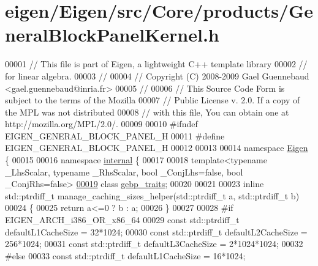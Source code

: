 \hypertarget{eigen_2_eigen_2src_2_core_2products_2_general_block_panel_kernel_8h_source}{}\section{eigen/\+Eigen/src/\+Core/products/\+General\+Block\+Panel\+Kernel.h}
\label{eigen_2_eigen_2src_2_core_2products_2_general_block_panel_kernel_8h_source}

\begin{DoxyCode}
00001 \textcolor{comment}{// This file is part of Eigen, a lightweight C++ template library}
00002 \textcolor{comment}{// for linear algebra.}
00003 \textcolor{comment}{//}
00004 \textcolor{comment}{// Copyright (C) 2008-2009 Gael Guennebaud <gael.guennebaud@inria.fr>}
00005 \textcolor{comment}{//}
00006 \textcolor{comment}{// This Source Code Form is subject to the terms of the Mozilla}
00007 \textcolor{comment}{// Public License v. 2.0. If a copy of the MPL was not distributed}
00008 \textcolor{comment}{// with this file, You can obtain one at http://mozilla.org/MPL/2.0/.}
00009 
00010 \textcolor{preprocessor}{#ifndef EIGEN\_GENERAL\_BLOCK\_PANEL\_H}
00011 \textcolor{preprocessor}{#define EIGEN\_GENERAL\_BLOCK\_PANEL\_H}
00012 
00013 
00014 \textcolor{keyword}{namespace }\hyperlink{namespace_eigen}{Eigen} \{
00015 
00016 \textcolor{keyword}{namespace }\hyperlink{namespaceinternal}{internal} \{
00017 
00018 \textcolor{keyword}{template}<\textcolor{keyword}{typename} \_LhsScalar, \textcolor{keyword}{typename} \_RhsScalar, \textcolor{keywordtype}{bool} \_ConjLhs=false, \textcolor{keywordtype}{bool} \_ConjRhs=false>
\hyperlink{class_eigen_1_1internal_1_1gebp__traits}{00019} \textcolor{keyword}{class }\hyperlink{class_eigen_1_1internal_1_1gebp__traits}{gebp\_traits};
00020 
00021 
00023 \textcolor{keyword}{inline} std::ptrdiff\_t manage\_caching\_sizes\_helper(std::ptrdiff\_t a, std::ptrdiff\_t b)
00024 \{
00025   \textcolor{keywordflow}{return} a<=0 ? b : a;
00026 \}
00027 
00028 \textcolor{preprocessor}{#if EIGEN\_ARCH\_i386\_OR\_x86\_64}
00029 \textcolor{keyword}{const} std::ptrdiff\_t defaultL1CacheSize = 32*1024;
00030 \textcolor{keyword}{const} std::ptrdiff\_t defaultL2CacheSize = 256*1024;
00031 \textcolor{keyword}{const} std::ptrdiff\_t defaultL3CacheSize = 2*1024*1024;
00032 \textcolor{preprocessor}{#else}
00033 \textcolor{keyword}{const} std::ptrdiff\_t defaultL1CacheSize = 16*1024;

\end{DoxyCode}

